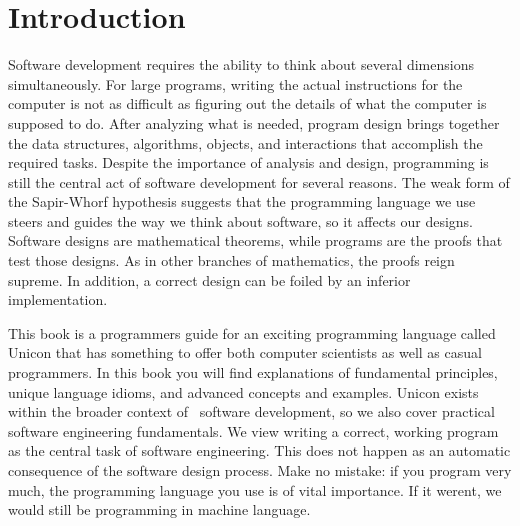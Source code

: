 \section{Introduction}
Software development requires the ability to think about several
dimensions simultaneously. For large programs, writing the actual
instructions for the computer is not as difficult as figuring out the
details of what the computer is supposed to do. After analyzing what is
needed, program design brings together the data structures, algorithms,
objects, and interactions that accomplish the required tasks. Despite
the importance of analysis and design, programming is still the central
act of software development for several reasons. The weak form of the
Sapir-Whorf hypothesis suggests that the programming
language we use steers and guides the way we think about software, so
it affects our designs. Software designs are mathematical theorems,
while programs are the proofs that test those designs. As in other
branches of mathematics, the proofs reign supreme. In addition, a
correct design can be foiled by an inferior implementation.

This book is a programmer{\textquotesingle}s guide for an exciting
programming language called Unicon that has something to offer both
computer scientists as well as casual programmers. In this book you
will find explanations of fundamental principles, unique language
idioms, and advanced concepts and examples. Unicon exists within the
broader context of \ software development, so we also cover practical
software engineering fundamentals. We view writing a correct, working
program as the central task of software engineering. This does not
happen as an automatic consequence of the software design process. Make
no mistake: if you program very much, the programming language you use
is of vital importance. If it weren{\textquotesingle}t, we would still
be programming in machine language.

